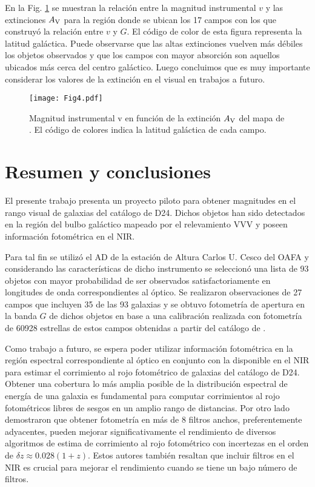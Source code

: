 \documentclass[baaa]{baaa}
\begin{document}
En la Fig. \ref{vG_ext} se muestran  la relación entre la magnitud instrumental $v$ y las extinciones $A_{\rm{V}}$ para la región donde se ubican los 17 campos con los que construyó la relación entre $v$ y $G$. El código de color de esta figura representa la latitud galáctica. Puede observarse que las altas extinciones vuelven más débiles los objetos observados y que los campos con mayor absorción son aquellos ubicados más cerca del centro galáctico. Luego concluimos que es muy importante considerar los valores de la extinción en el visual en trabajos a futuro.

\begin{figure}[!t]
\centering
\texttt{[image: Fig4.pdf]}
\caption{Magnitud instrumental v en función de la extinción $A_{\rm{V}}$ del mapa de \cite{schlafly2011}. El código de colores indica la latitud galáctica de cada campo.}
\label{vG_ext}
\end{figure}

\section{Resumen y conclusiones}

El presente trabajo presenta un proyecto piloto para obtener magnitudes en el rango visual de galaxias del catálogo de D24. Dichos objetos han sido detectados en la región del bulbo galáctico mapeado por el relevamiento VVV y poseen información fotométrica en el NIR.

Para tal fin se utilizó el AD de la estación de Altura Carlos U. Cesco del OAFA y considerando las características de dicho instrumento se seleccionó una lista de 93 objetos con mayor probabilidad de ser observados satisfactoriamente en longitudes de onda correspondientes al óptico. Se realizaron observaciones de 27 campos que incluyen 35 de las 93 galaxias y se obtuvo fotometría de apertura en la banda $G$ de dichos objetos en base a una calibración realizada con fotometría de 60928 estrellas de estos campos obtenidas a partir del  catálogo de \cite{carrasco2023}. 

Como trabajo a futuro, se espera poder utilizar información fotométrica en la región espectral correspondiente al óptico en conjunto con la disponible en el NIR para estimar el corrimiento al rojo fotométrico de galaxias del catálogo de D24. Obtener una cobertura lo más amplia posible de la distribución espectral de energía de una galaxia es fundamental para computar corrimientos al rojo fotométricos libres de sesgos en un amplio rango de distancias. Por otro lado \citet{Benintez2009} demostraron que obtener fotometría en más de 8 filtros anchos, preferentemente adyacentes, pueden mejorar significativamente el rendimiento de diversos algoritmos de estima de corrimiento al rojo fotométrico con incertezas en el orden de ${\delta}z\approx 0.028(1+z)$. Estos autores también resaltan que incluir filtros en el NIR es crucial para mejorar el rendimiento cuando se tiene un bajo número de filtros.
\end{document}
